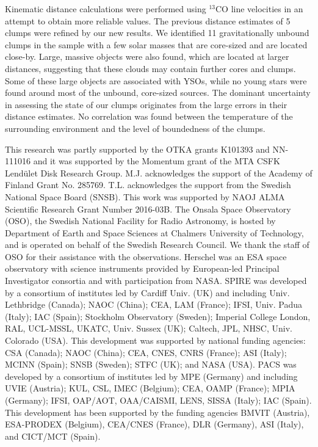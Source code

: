 \documentclass[printer]{aa}
\begin{document}
Kinematic distance calculations were performed using $^{13}$CO line velocities in an attempt to obtain more reliable values. The previous distance estimates of 5 clumps were refined by our new results. We identified 11 gravitationally unbound clumps in the sample with a few solar masses that are core-sized and are located close-by. Large, massive objects were also found, which are located at larger distances, suggesting that these clouds may contain further cores and clumps. Some of these large objects are associated with YSOs, while no young stars were found around most of the unbound, core-sized sources. The dominant uncertainty in assessing the state of our clumps originates from the large errors in their distance estimates. No correlation was found between the temperature of the surrounding environment and the level of boundedness of the clumps.

\begin{acknowledgements}
This research was partly supported by the OTKA grants K101393 and NN-111016 and it was supported by the Momentum grant of the MTA CSFK Lend\"ulet Disk Research Group. M.J. acknowledges the support of the Academy of Finland Grant No. 285769. T.L. acknowledges the support from the Swedish National Space Board (SNSB). This work was supported by NAOJ ALMA Scientific Research Grant Number 2016-03B.
The Onsala Space Observatory (OSO), the Swedish National Facility for Radio Astronomy, is hosted by Department of Earth and Space Sciences at Chalmers University of Technology, and is operated on behalf of the Swedish Research Council. We thank the staff of OSO for their assistance with the observations.
Herschel was an ESA space observatory with science instruments provided by European-led Principal Investigator consortia and with participation from NASA. SPIRE was developed by a consortium of institutes led by Cardiff Univ. (UK) and including Univ. Lethbridge (Canada); NAOC (China); CEA, LAM (France); IFSI, Univ. Padua (Italy); IAC (Spain); Stockholm Observatory (Sweden); Imperial College London, RAL, UCL-MSSL, UKATC, Univ. Sussex (UK); Caltech, JPL, NHSC, Univ. Colorado (USA). This development was supported by national funding agencies: CSA (Canada); NAOC (China); CEA, CNES, CNRS (France); ASI (Italy); MCINN (Spain); SNSB (Sweden); STFC (UK); and NASA (USA). PACS was developed by a consortium of institutes led by MPE (Germany) and including UVIE (Austria); KUL, CSL, IMEC (Belgium); CEA, OAMP (France); MPIA (Germany); IFSI, OAP/AOT, OAA/CAISMI, LENS, SISSA (Italy); IAC (Spain). This development has been supported by the funding agencies BMVIT (Austria), ESA-PRODEX (Belgium), CEA/CNES (France), DLR (Germany), ASI (Italy), and CICT/MCT (Spain).\\
\end{acknowledgements}
\end{document}
